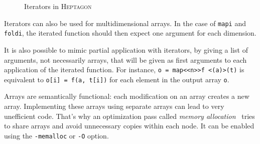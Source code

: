\documentclass[a4paper]{article}
\begin{document}
\begin{figure}[htp]
 \centering
  \caption{Iterators in \textsc{Heptagon}}
  \label{fig:iterators}
\end{figure}

Iterators can also be used for multidimensional arrays. In the case of \lstinline+mapi+ and \lstinline+foldi+, the iterated function should then expect one argument for each dimension.

It is also possible to mimic partial application with iterators, by giving a list of arguments, not necessarily arrays, that will be given as first arguments to each application of the iterated function. For instance, \lstinline+o = map<<n>>f <(a)>(t)+ is equivalent to \lstinline+o[i] = f(a, t[i])+ for each element in the output array \lstinline+o+.

Arrays are semantically functional: each modification on an array creates a new array. Implementing these arrays using separate arrays can lead to very unefficient code. That's why an optimization pass called \emph{memory allocation}~\cite{Gerard:2012} tries to share arrays and avoid unnecessary copies within each node. It can be enabled using the \texttt{-memalloc} or \texttt{-O} option.
\end{document}
